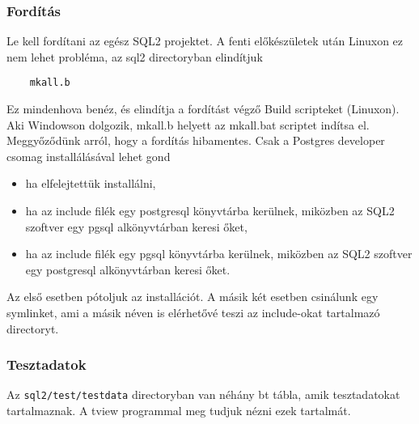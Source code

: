 \subsubsection*{Fordítás}

Le kell fordítani az egész SQL2 projektet. A fenti előkészületek
után Linuxon ez nem lehet probléma, az sql2 directoryban elindítjuk

\begin{verbatim}
    mkall.b
\end{verbatim}

Ez mindenhova benéz, és elindítja a fordítást végző Build
scripteket (Linuxon). Aki Windowson dolgozik, 
mkall.b helyett az mkall.bat scriptet indítsa el.
%
Meggyőződünk arról, hogy a fordítás hibamentes. Csak a
Postgres developer csomag installálásával lehet gond
\begin{itemize}
\item 
    ha elfelejtettük installálni,
\item 
    ha az include filék egy postgresql könyvtárba kerülnek,
    miközben az SQL2 szoftver egy pgsql alkönyvtárban keresi őket,
\item 
    ha az include filék egy pgsql könyvtárba kerülnek,
    miközben az SQL2 szoftver egy postgresql alkönyvtárban keresi őket.
\end{itemize}
Az első esetben pótoljuk az installációt. A másik két esetben
csinálunk egy symlinket, ami a másik néven is elérhetővé teszi
az include-okat tartalmazó directoryt.

\subsubsection*{Tesztadatok}

Az \verb!sql2/test/testdata! directoryban van néhány bt tábla,
amik tesztadatokat tartalmaznak. A tview programmal meg tudjuk
nézni ezek tartalmát.

